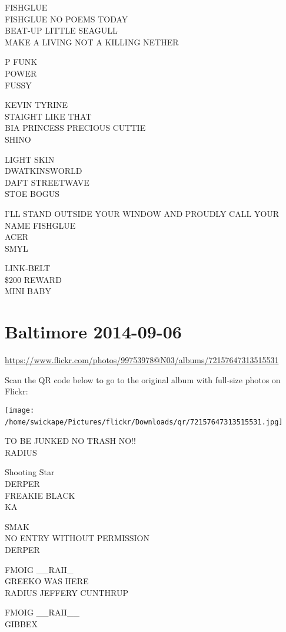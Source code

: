 \documentclass[10pt,letterpaper]{article}
\begin{document}
FISHGLUE\\
FISHGLUE NO POEMS TODAY\\
BEAT{-}UP LITTLE SEAGULL\\
MAKE A LIVING NOT A KILLING NETHER

P FUNK\\
POWER\\
FUSSY

KEVIN TYRINE\\
STAIGHT LIKE THAT\\
BIA PRINCESS PRECIOUS CUTTIE\\
SHINO

LIGHT SKIN\\
DWATKINSWORLD\\
DAFT STREETWAVE\\
STOE BOGUS

I'LL STAND OUTSIDE YOUR WINDOW AND PROUDLY CALL YOUR NAME FISHGLUE\\
ACER\\
SMYL

LINK{-}BELT\\
\$200 REWARD\\
MINI BABY
\

\section*{Baltimore 2014-09-06}

\url{https://www.flickr.com/photos/99753978@N03/albums/72157647313515531}

Scan the QR code below to go to the original album with full-size photos on Flickr:

\texttt{[image: /home/swickape/Pictures/flickr/Downloads/qr/72157647313515531.jpg]}
\

TO BE JUNKED NO TRASH NO!!\\
RADIUS

Shooting Star\\
DERPER\\
FREAKIE BLACK\\
KA

SMAK\\
NO ENTRY WITHOUT PERMISSION\\
DERPER

FMOIG \_\_RAII\_\\
GREEKO WAS HERE\\
RADIUS JEFFERY CUNTHRUP

FMOIG \_\_RAII\_\_\\
GIBBEX
\end{document}
